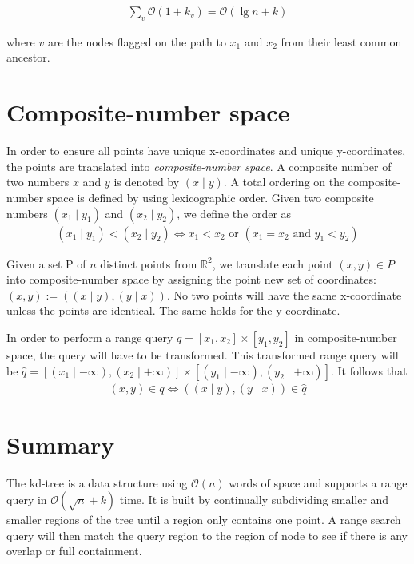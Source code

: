 \begin{align*}
  \sum\limits_{v} \mathcal{O}(1 + k_v) = \mathcal{O}(\lg n + k)
\end{align*}

\noindent where $v$ are the nodes flagged on the path to $x_1$ and $x_2$ from their least common ancestor.

\section{Composite-number space} 
\label{sect:composite}
In order to ensure all points have unique x-coordinates and unique y-coordinates, the points are translated into \emph{composite-number space}. A composite number of two numbers $x$ and $y$ is denoted by $(x \mid y)$. A total ordering on the composite-number space is defined by using lexicographic order. Given two composite numbers $(x_1 \mid y_1)$ and $(x_2 \mid y_2)$, we define the order as
\begin{align*}
  (x_1 \mid y_1) < (x_2 \mid y_2) \iff x_1 < x_2 \text{ or } (x_1 = x_2 \text{ and } y_1 < y_2)
\end{align*}

\noindent Given a set P of $n$ distinct points from $\mathbb{R}^2$, we translate each point $(x,y) \in P$ into composite-number space by assigning the point new set of coordinates: $(x,y) := ( (x \mid y), (y \mid x) )$. No two points will have the same x-coordinate unless the points are identical. The same holds for the y-coordinate.

\noindent In order to perform a range query $q = [x_1, x_2] \times [y_1, y_2]$ in composite-number space, the query will have to be transformed. This transformed range query will be $\hat{q} = [(x_1 \mid -\infty), (x_2 \mid +\infty)] \times [(y_1 \mid -\infty), (y_2 \mid +\infty)]$. It follows that 
\begin{align*}
  (x,y) \in q \iff ( (x \mid y), (y \mid x) ) \in \hat{q}
\end{align*}


\section{Summary}
\label{sect:relsummary}

The kd-tree is a data structure using $\mathcal{O}(n)$ words of space and supports a range query in $\mathcal{O}(\sqrt{n} + k)$ time. It is built by continually subdividing smaller and smaller regions of the tree until a region only contains one point. A range search query will then match the query region to the region of node to see if there is any overlap or full containment. 

